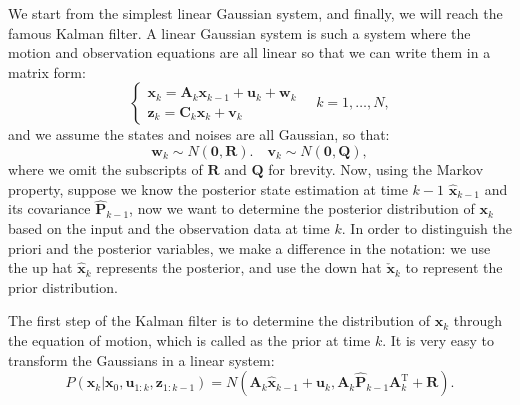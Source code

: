 We start from the simplest linear Gaussian system, and finally, we will reach the famous Kalman filter. A linear Gaussian system is such a system where the motion and observation equations are all linear so that we can write them in a matrix form:
\begin{equation}
	\left\{ \begin{array}{l}
		{\mathbf{x}_k} = \mathbf{A}_k {{\mathbf{x}_{k - 1}}+{\mathbf{u}_k}} + \mathbf{w}_k \\
		{\mathbf{z}_{k}} = \mathbf{C}_k  { \mathbf{x}_k} + \mathbf{v}_{k} \end{array} \right. \quad k=1, \ldots, N ,
\end{equation}
and we assume the states and noises are all Gaussian, so that: 
\begin{equation}
	\mathbf{w}_k \sim N(\mathbf{0}, \mathbf{R}). \quad \mathbf{v}_k \sim N( \mathbf{0}, \mathbf{Q}),
\end{equation}
where we omit the subscripts of $\mathbf{R}$ and $\mathbf{Q}$ for brevity. Now, using the Markov property, suppose we know the posterior state estimation at time $k-1$ $\mathbf{\hat{x}}_{k-1} $ and its covariance $\mathbf{\hat{P}}_{k-1}$, now we want to determine the posterior distribution of $\mathbf{x}_k$ based on the input and the observation data at time $k$. In order to distinguish the priori and the posterior variables, we make a difference in the notation: we use the up hat $\mathbf{\hat{x}}_k$ represents the posterior, and use the down hat $\check{\mathbf{x}}_k $ to represent the prior distribution. 

The first step of the Kalman filter is to determine the distribution of $\mathbf{x}_k$ through the equation of motion, which is called as the prior at time $k$. It is very easy to transform the Gaussians in a linear system: 
\begin{equation}
	P\left( {{\mathbf{x}_k}|{\mathbf{x}_0},{\mathbf{u}_{1:k}},{\mathbf{z}_{1:k - 1}}} \right) = N\left( {\mathbf{A}_k {{\hat{\mathbf{x}}}_{k - 1}} + {\mathbf{u}_k}, \mathbf{A}_k\hat{\mathbf{P}}_{k-1} {\mathbf{A}_k^\mathrm{T}} + \mathbf{R}} \right).
\end{equation}

